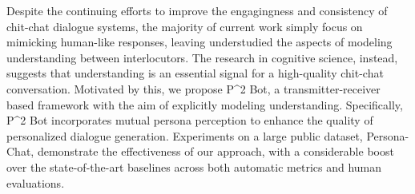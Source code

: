 Despite the continuing efforts to improve the engagingness and consistency of chit-chat dialogue systems, the majority of current work simply focus on mimicking human-like responses, leaving understudied the aspects of modeling understanding between interlocutors. The research in cognitive science, instead, suggests that understanding is an essential signal for a high-quality chit-chat conversation. Motivated by this, we propose P^2 Bot, a transmitter-receiver based framework with the aim of explicitly modeling understanding. Specifically, P^2 Bot incorporates mutual persona perception to enhance the quality of personalized dialogue generation. Experiments on a large public dataset, Persona-Chat, demonstrate the effectiveness of our approach, with a considerable boost over the state-of-the-art baselines across both automatic metrics and human evaluations.
